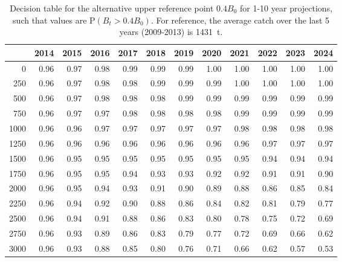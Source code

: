 \documentclass[11pt]{book}
\begin{document}
\begin{table}[!ht]
\centering
\caption{Decision table for the alternative upper reference point $0.4 B_0$ for 1-10 year projections, such that values are P$(B_t > 0.4 B_0)$. For reference, the average catch over the last 5 years (2009-2013) is 1431~t.} 
\label{tab:B0_0.4}
\begin{tabular}{rrrrrrrrrrrr}
  \\[-1.0ex] \hline
 & 2014 & 2015 & 2016 & 2017 & 2018 & 2019 & 2020 & 2021 & 2022 & 2023 & 2024 \\ 
  \hline
0 & 0.96 & 0.97 & 0.98 & 0.99 & 0.99 & 0.99 & 1.00 & 1.00 & 1.00 & 1.00 & 1.00 \\ 
  250 & 0.96 & 0.97 & 0.98 & 0.98 & 0.99 & 0.99 & 0.99 & 1.00 & 1.00 & 1.00 & 1.00 \\ 
  500 & 0.96 & 0.97 & 0.98 & 0.98 & 0.98 & 0.99 & 0.99 & 0.99 & 0.99 & 0.99 & 0.99 \\ 
  750 & 0.96 & 0.97 & 0.97 & 0.98 & 0.98 & 0.98 & 0.98 & 0.99 & 0.99 & 0.99 & 0.99 \\ 
  1000 & 0.96 & 0.96 & 0.97 & 0.97 & 0.97 & 0.97 & 0.97 & 0.98 & 0.98 & 0.98 & 0.98 \\ 
  1250 & 0.96 & 0.96 & 0.96 & 0.96 & 0.96 & 0.96 & 0.96 & 0.96 & 0.97 & 0.97 & 0.97 \\ 
  1500 & 0.96 & 0.95 & 0.95 & 0.95 & 0.95 & 0.95 & 0.95 & 0.95 & 0.94 & 0.94 & 0.94 \\ 
  1750 & 0.96 & 0.95 & 0.95 & 0.94 & 0.93 & 0.93 & 0.92 & 0.92 & 0.91 & 0.91 & 0.90 \\ 
  2000 & 0.96 & 0.95 & 0.94 & 0.93 & 0.91 & 0.90 & 0.89 & 0.88 & 0.86 & 0.85 & 0.84 \\ 
  2250 & 0.96 & 0.94 & 0.92 & 0.90 & 0.88 & 0.86 & 0.84 & 0.82 & 0.81 & 0.79 & 0.77 \\ 
  2500 & 0.96 & 0.94 & 0.91 & 0.88 & 0.86 & 0.83 & 0.80 & 0.78 & 0.75 & 0.72 & 0.69 \\ 
  2750 & 0.96 & 0.93 & 0.89 & 0.86 & 0.83 & 0.79 & 0.77 & 0.72 & 0.69 & 0.66 & 0.62 \\ 
  3000 & 0.96 & 0.93 & 0.88 & 0.85 & 0.80 & 0.76 & 0.71 & 0.66 & 0.62 & 0.57 & 0.53 \\ 
   \hline
\end{tabular}
\end{table}
 \clearpage \pagebreak 


\clearpage
\end{document}
